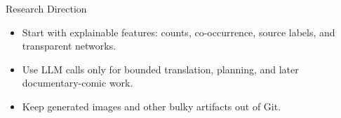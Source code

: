 \documentclass{beamer}
\begin{document}
\begin{frame}{Research Direction}
  \begin{itemize}
    \item Start with explainable features: counts, co-occurrence, source labels, and transparent networks.
    \item Use LLM calls only for bounded translation, planning, and later documentary-comic work.
    \item Keep generated images and other bulky artifacts out of Git.
  \end{itemize}
\end{frame}
\end{document}
